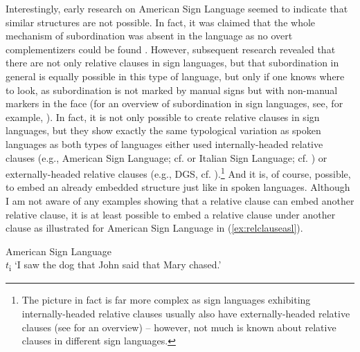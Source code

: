 Interestingly, early research on American Sign Language seemed to indicate that similar structures are not possible. In fact, it was claimed that the whole mechanism of subordination was absent in the language as no overt complementizers could be found \citep{thompson1977lack}. However, subsequent research revealed that there are not only relative clauses in sign languages, but that subordination in general is equally possible in this type of language, but only if one knows where to look, as subordination is not marked by manual signs but with non-manual markers in the face \citep{liddell1980american, padden1983action} (for an overview of subordination in sign languages, see, for example, \citealt{gijn2004quest,branchini2014,pfausteinher2016matterofcompl,pfausteinbach2016complexsentences}). In fact, it is not only possible to create relative clauses in sign languages, but they show exactly the same typological variation as spoken languages as both types of languages either used internally-headed relative clauses (e.g., American Sign Language; cf. \citealt{liddell1980american} or Italian Sign Language; cf. \citealt{branchini2014}) or externally-headed relative clauses (e.g., DGS, cf.  \citealt{pfau2005relative}).\footnote{ The picture in fact is far more complex as sign languages exhibiting internally-headed relative clauses usually also have externally-headed relative clauses (see \citealt{wilbur2017internally} for an overview) -- however, not much is known about relative clauses in different sign languages.} And it is, of course, possible, to embed an already embedded structure just like in spoken languages. Although I am not aware of any examples showing that a relative clause can embed another relative clause, it is at least possible to embed a relative clause under another clause as illustrated for American Sign Language in (\ref{ex:relclauseasl}). 

\begin{exe}
\ex American Sign Language \citep[10]{wilbur2017internally}\\ %
   $t$\textsubscript{i} 
\glt `I saw the dog that John said that Mary chased.' \label{ex:relclauseasl} 
\end{exe} 

